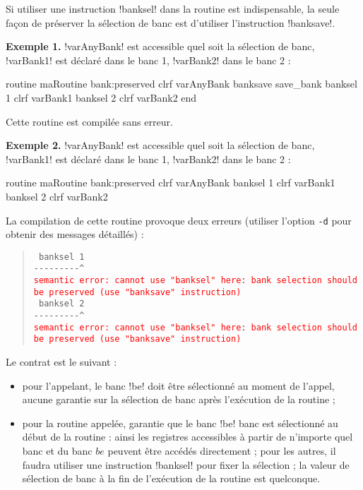 Si utiliser une instruction \pic!banksel! dans la routine est indispensable, la seule façon de préserver la sélection de banc est d'utiliser l'instruction \pic!banksave!. 

\textbf{Exemple 1.} \pic!varAnyBank! est accessible quel soit la sélection de banc, \pic!varBank1! est déclaré dans le banc 1, \pic!varBank2! dans le banc 2 :
\begin{piccolo}
routine maRoutine bank:preserved {
  clrf varAnyBank
  banksave save_bank
    banksel 1
    clrf varBank1
    banksel 2
    clrf varBank2
  end
}
\end{piccolo}

Cette routine est compilée sans erreur.


\textbf{Exemple 2.} \pic!varAnyBank! est accessible quel soit la sélection de banc, \pic!varBank1! est déclaré dans le banc 1, \pic!varBank2! dans le banc 2 :
\begin{piccolo}
routine maRoutine bank:preserved {
  clrf varAnyBank
  banksel 1
  clrf varBank1
  banksel 2
  clrf varBank2
}
\end{piccolo}

La compilation de cette routine provoque deux erreurs (utiliser l’option \texttt{-d} pour obtenir des messages détaillés) :

\begin{quote}
\texttt{ banksel 1}\\
\texttt{-{-}-{-}-{-}-{-}-\^}\\
\textcolor{red}{\tt semantic error: cannot use "banksel" here: bank selection should be preserved (use "banksave" instruction)}\\

\texttt{  banksel 2}\\
\texttt{-{-}-{-}-{-}-{-}-\^}\\
\textcolor{red}{\tt semantic error: cannot use "banksel" here: bank selection should be preserved (use "banksave" instruction)}
\end{quote}














Le contrat est le suivant :
\begin{itemize}
  \item pour l'appelant, le banc \pic!be! doit être sélectionné au moment de l'appel, aucune garantie sur la sélection de banc après l'exécution de la routine ; 
  \item pour la routine appelée, garantie que le banc \pic!be! banc est sélectionné au début de la routine : ainsi les registres accessibles à partir de n'importe quel banc et du banc $be$ peuvent être accédés directement ; pour les autres, il faudra utiliser une instruction \pic!banksel! pour fixer la sélection ; la valeur de sélection de banc à la fin de l'exécution de la routine est quelconque.
\end{itemize}

